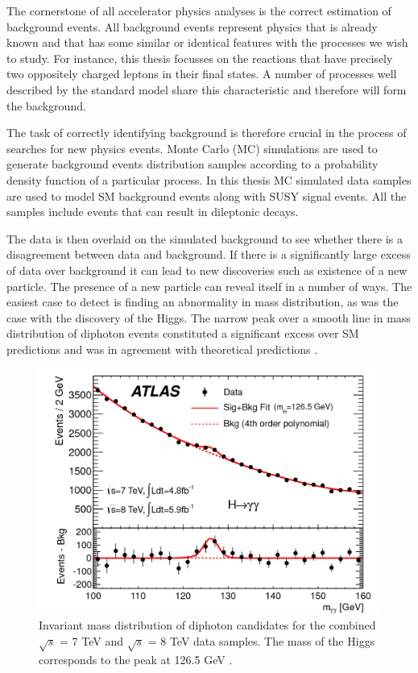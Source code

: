 The cornerstone of all accelerator physics analyses is the correct estimation of background events. All background events represent physics that is already known and that has some similar or identical features with the processes we wish to study. For instance, this thesis focusses on the reactions that have precisely two oppositely charged leptons in their final states. A number of processes well described by the standard model share this characteristic and therefore will form the background. 

The task of correctly identifying background is therefore crucial in the process of searches for new physics events. Monte Carlo (MC) simulations are used to generate background events distribution samples according to a probability density function of a particular process. In this thesis MC simulated data samples are used to model SM background events along with SUSY signal events. All the samples include events that can result in dileptonic decays. 

The data is then overlaid on the simulated background to see whether there is a disagreement between data and background. If there is a significantly large excess of data over background it can lead to new discoveries such as existence of a new particle.  The presence of a new particle can reveal itself in a number of ways. The easiest case to detect is finding an abnormality in mass distribution, as was the case with the discovery of the Higgs. The narrow peak over a smooth line in mass distribution of diphoton events constituted a significant excess over SM predictions and was in agreement with theoretical predictions \citep{chatrchyan2012observation,Aad:2012tfa}. 

\begin{figure}
	\centering
	\captionsetup{width=0.8\textwidth}
	\includegraphics[scale=0.2]{Chap3/figaux_004a}
	\caption[Invariant mass of diphoton events: discovery of the Higgs]{Invariant mass distribution of diphoton 				candidates for the combined $\sqrt{s}$ = 7 TeV and $\sqrt{s}$ = 8 TeV 			data samples. The mass of the Higgs corresponds to the peak at 126.5 				GeV \citep{Aad:2012tfa}.}
\end{figure}

